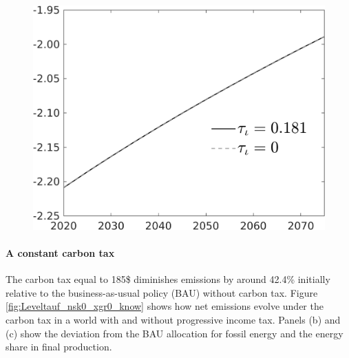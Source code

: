 \begin{figure}[h!!]
\begin{minipage}[]{0.32\textwidth}
\end{minipage}
\begin{minipage}[]{0.32\textwidth}
\includegraphics[width=1\textwidth]{../../codding_model/own_basedOnFried/optimalPol_010922_revision/figures/all_13Sept22/PerdifNoTauf_regime0_CompTaul_EY_spillover0_nsk0_xgr0_knspil0_sep0_LFlimit0_emsbase0_countec0_GovRev0_etaa0.79_lgd1.png}
\end{minipage}

\end{figure} 

\paragraph{A constant carbon tax}
 The carbon tax equal to 185\$ diminishes emissions by around 42.4\% initially relative to the business-as-usual policy (BAU) without carbon tax.
 Figure \ref{fig:Leveltauf_nsk0_xgr0_know} shows how net emissions evolve under the carbon tax in a world with and without progressive income tax. Panels (b) and (c) show the deviation from the BAU allocation for fossil energy and the energy share in final production.
 
